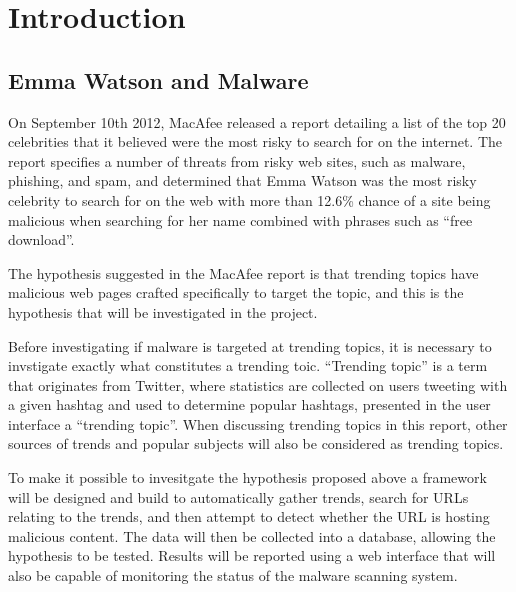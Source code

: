 \section{Introduction}

\subsection{Emma Watson and Malware}
On September 10th 2012, MacAfee released a report detailing a list of the top 20
celebrities that it believed were the most risky to search for on the internet\cite{mac-watson}.
The report specifies a number of threats from risky web sites, such as malware,
phishing, and spam, and determined that Emma Watson was the most risky celebrity
to search for on the web with more than 12.6\% chance of a site being malicious
when searching for her name combined with phrases such as ``free download''.

The hypothesis suggested in the MacAfee report is that trending topics have
malicious web pages crafted specifically to target the topic, and this is the
hypothesis that will be investigated in the project.

Before investigating if malware is targeted at trending topics, it is necessary to
invstigate exactly what constitutes a trending toic. ``Trending topic'' is a term
that originates from Twitter, where statistics are collected on users tweeting
with a given hashtag and used to determine popular hashtags, presented in the
user interface a ``trending topic''. When discussing trending topics in this
report, other sources of trends and popular subjects will also be considered as
trending topics.

To make it possible to invesitgate the hypothesis proposed above a framework
will be designed and build to automatically gather trends, search for URLs
relating to the trends, and then attempt to detect whether the URL is hosting
malicious content. The data will then be collected into a database, allowing the
hypothesis to be tested. Results will be reported using a web interface that
will also be capable of monitoring the status of the malware scanning system.


